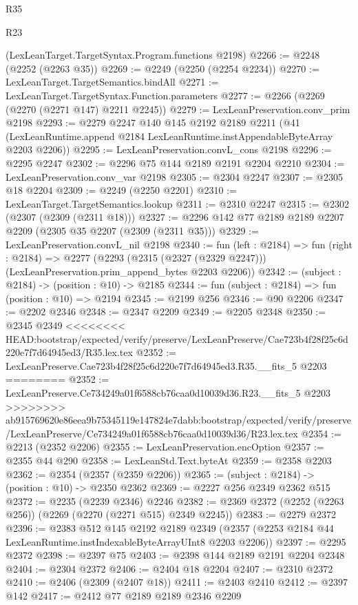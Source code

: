 \begin{lexlean}{R35}
\begin{lexlean}{R23}
\begin{coremodule}
{{{{{{{{{{{{{{{{{{{{{    (LexLeanTarget.TargetSyntax.Program.functions @2198)
@2266 := @2248 (@2252 (@2263 @35))
@2269 := @2249 (@2250 (@2254 @2234))
@2270 := LexLeanTarget.TargetSemantics.bindAll
@2271 := LexLeanTarget.TargetSyntax.Function.parameters
@2277 := @2266 (@2269 (@2270 (@2271 @147) @2211 @2245))
@2279 := LexLeanPreservation.conv_prim @2198
@2293 := @2279
    @2247
    @140
    @145
    @2192
    @2189
    @2211
    (@41 (LexLeanRuntime.append @2184 LexLeanRuntime.instAppendableByteArray @2203 @2206))
@2295 := LexLeanPreservation.convL_cons @2198
@2296 := @2295 @2247
@2302 := @2296 @75 @144 @2189 @2191 @2204 @2210
@2304 := LexLeanPreservation.conv_var @2198
@2305 := @2304 @2247
@2307 := @2305 @18 @2204
@2309 := @2249 (@2250 @2201)
@2310 := LexLeanTarget.TargetSemantics.lookup
@2311 := @2310 @2247
@2315 := @2302 (@2307 (@2309 (@2311 @18)))
@2327 := @2296 @142 @77 @2189 @2189 @2207 @2209 (@2305 @35 @2207 (@2309 (@2311 @35)))
@2329 := LexLeanPreservation.convL_nil @2198
@2340 := fun (left : @2184) =>
  fun (right : @2184) =>
  @2277 (@2293 (@2315 (@2327 (@2329 @2247))) (LexLeanPreservation.prim_append_bytes @2203 @2206))
@2342 := (subject : @2184) -> (position : @10) -> @2185
@2344 := fun (subject : @2184) => fun (position : @10) => @2194
@2345 := @2199 @256
@2346 := @90 @2206
@2347 := @2202 @2346
@2348 := @2347 @2209
@2349 := @2205 @2348
@2350 := @2345 @2349
<<<<<<<< HEAD:bootstrap/expected/verify/preserve/LexLeanPreserve/Cae723b4f28f25c6d220e7f7d64945ed3/R35.lex.tex
@2352 := LexLeanPreserve.Cae723b4f28f25c6d220e7f7d64945ed3.R35.__fits_5 @2203
========
@2352 := LexLeanPreserve.Ce734249a01f6588cb76caa0d10039d36.R23.__fits_5 @2203
>>>>>>>> ab915769620e86eea9b75345119e147824e7dabb:bootstrap/expected/verify/preserve/LexLeanPreserve/Ce734249a01f6588cb76caa0d10039d36/R23.lex.tex
@2354 := @2213 (@2352 @2206)
@2355 := LexLeanPreservation.encOption
@2357 := @2355 @44 @290
@2358 := LexLeanStd.Text.byteAt
@2359 := @2358 @2203
@2362 := @2354 (@2357 (@2359 @2206))
@2365 := (subject : @2184) -> (position : @10) -> @2350 @2362
@2369 := @2227 @256 @2349 @2362 @515
@2372 := @2235 (@2239 @2346) @2246
@2382 := @2369 @2372 (@2252 (@2263 @256)) (@2269 (@2270 (@2271 @515) @2349 @2245))
@2383 := @2279 @2372
@2396 := @2383
    @512
    @145
    @2192
    @2189
    @2349
    (@2357 (@2253 @2184 @44 LexLeanRuntime.instIndexableByteArrayUInt8 @2203 @2206))
@2397 := @2295 @2372
@2398 := @2397 @75
@2403 := @2398 @144 @2189 @2191 @2204 @2348
@2404 := @2304 @2372
@2406 := @2404 @18 @2204
@2407 := @2310 @2372
@2410 := @2406 (@2309 (@2407 @18))
@2411 := @2403 @2410
@2412 := @2397 @142
@2417 := @2412 @77 @2189 @2189 @2346 @2209
}}}}}}}}}}}}}}}}}}}}}
\end{coremodule}
\end{lexlean}
\end{lexlean}
